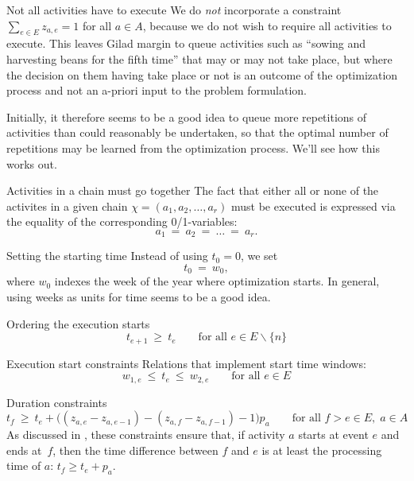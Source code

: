 \documentclass[11pt,reqno]{amsart}
\numberwithin{equation}{section}
\begin{document}
\begin{mydesc}

\item[Not all activities have to execute] We do \emph{not} incorporate a constraint
  $\sum_{e\in E} z_{a,e}=1$ for all $a\in A$, because we do not wish to require all
  activities to execute. This leaves Gilad margin to queue activities such as ``sowing and
  harvesting beans for the fifth time'' that may or may not take place, but where the
  decision on them having take place or not is an outcome of the optimization process and
  not an a-priori input to the problem formulation.

  Initially, it therefore seems to be a good idea to queue more repetitions of activities
  than could reasonably be undertaken, so that the optimal number of repetitions may be
  learned from the optimization process. We'll see how this works out.

\item[Activities in a chain must go together] The fact that either all or none of the
  activites in a given chain $\chi=(a_1,a_2,\dots,a_r)$ must be executed is expressed via
  the equality of the corresponding 0/1-variables:
  \begin{equation}
    a_1 \ = \ a_2 \ = \ \dots \ = \ a_r.
  \end{equation}

\item[Setting the starting time] Instead of using $t_0=0$, we set
  \begin{equation}
     t_0
     \ = \
     w_0,
  \end{equation}
  where $w_0$ indexes the week of the year where optimization starts. In general, using
  weeks as units for time seems to be a good idea.

\item[Ordering the execution starts]
  \begin{equation}
     t_{e+1} 
     \ \ge \
     t_e
     \qquad\text{for all }
      e\in E\smallsetminus\{n\}
  \end{equation}

\item[Execution start constraints] Relations that implement start time windows:
  \begin{equation}
    w_{1,e}\ \le\ t_e \ \le \ w_{2,e}
    \qquad\text{for all } e\in E
  \end{equation}
  

\item[Duration constraints]
  \begin{equation}
     t_f 
     \ \ge \
     t_e + \big((z_{a,e} - z_{a,e-1} ) - (z_{a,f} - z_{a,f-1}) - 1\big) p_a
     \qquad\text{for all } f>e\in E,\; a\in A
  \end{equation}
  As discussed in \cite{artigues-etal11}, these constraints ensure that,
if activity $a$ starts at event $e$ and ends at~$f$, then the time difference between  $f$
and $e$ is at least the processing time of $a$: $t_f \ge t_e + p_a$.


\end{mydesc}
\end{document}
